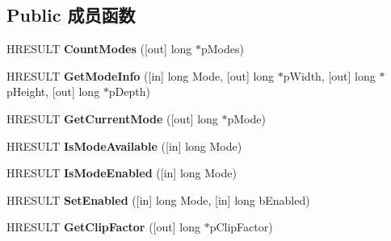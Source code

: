\subsection*{Public 成员函数}
\begin{DoxyCompactItemize}
\item 
\mbox{\label{interface_i_full_screen_video_ab6f22ba47fc3a8d1b78e47b2bbfa1f79}} 
H\+R\+E\+S\+U\+LT {\bfseries Count\+Modes} (\mbox{[}out\mbox{]} long $\ast$p\+Modes)
\item 
\mbox{\label{interface_i_full_screen_video_abd60c2622ca14a4987ee86bd9771bb9b}} 
H\+R\+E\+S\+U\+LT {\bfseries Get\+Mode\+Info} (\mbox{[}in\mbox{]} long Mode, \mbox{[}out\mbox{]} long $\ast$p\+Width, \mbox{[}out\mbox{]} long $\ast$p\+Height, \mbox{[}out\mbox{]} long $\ast$p\+Depth)
\item 
\mbox{\label{interface_i_full_screen_video_afd733060667e71a299b5754f75fba0ab}} 
H\+R\+E\+S\+U\+LT {\bfseries Get\+Current\+Mode} (\mbox{[}out\mbox{]} long $\ast$p\+Mode)
\item 
\mbox{\label{interface_i_full_screen_video_a87c84028923ee4c39ec5ac21d69b2927}} 
H\+R\+E\+S\+U\+LT {\bfseries Is\+Mode\+Available} (\mbox{[}in\mbox{]} long Mode)
\item 
\mbox{\label{interface_i_full_screen_video_a2955bf3d2db9fb2f858b54170cc2ee35}} 
H\+R\+E\+S\+U\+LT {\bfseries Is\+Mode\+Enabled} (\mbox{[}in\mbox{]} long Mode)
\item 
\mbox{\label{interface_i_full_screen_video_a276d38e75765c66f77b6f11009231cde}} 
H\+R\+E\+S\+U\+LT {\bfseries Set\+Enabled} (\mbox{[}in\mbox{]} long Mode, \mbox{[}in\mbox{]} long b\+Enabled)
\item 
\mbox{\label{interface_i_full_screen_video_aedbcc04eab00503fcd48644aab151d3d}} 
H\+R\+E\+S\+U\+LT {\bfseries Get\+Clip\+Factor} (\mbox{[}out\mbox{]} long $\ast$p\+Clip\+Factor)
\item 
\mbox{\label{interface_i_full_screen_video_a20e3e43be5a65fd6bb0615bb6626512e}} 

\end{DoxyCompactItemize}
